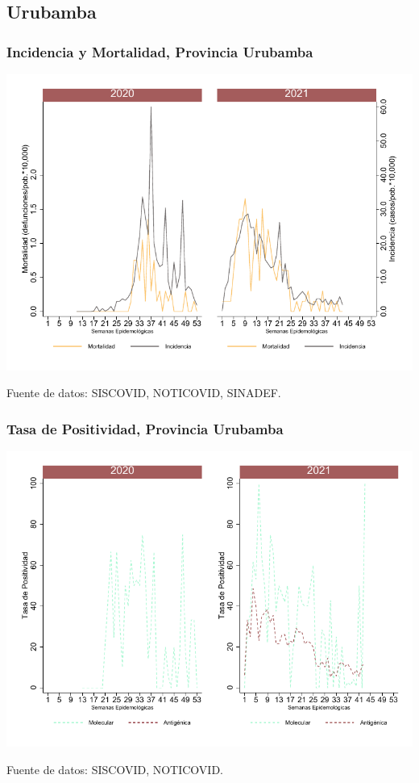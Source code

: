 \documentclass[xcolor=table]{beamer}
\begin{document}
\subsection{Urubamba}

\begin{frame}[label=Urubamba]
	\frametitle{\large Incidencia y Mortalidad, Provincia Urubamba}
	\vspace{-.5cm}
	\begin{center}
		\includegraphics[width=0.8\linewidth, trim={0cm .5cm 0cm 0.2cm},clip]{../figuras/incidencia_mortalidad_20_21_13.pdf}
	\end{center}
	{\tiny Fuente de datos: SISCOVID, NOTICOVID, SINADEF.}
\end{frame}

\begin{frame}
	\frametitle{Tasa de Positividad, Provincia Urubamba}
	\vspace{-.5cm}
	\begin{center}
		\includegraphics[width=0.8\linewidth, trim={0cm .5cm 0cm 0.2cm},clip]{../figuras/positividad_20_21_13.pdf}
	\end{center}
	{\tiny Fuente de datos: SISCOVID, NOTICOVID.}
\end{frame}
\end{document}
